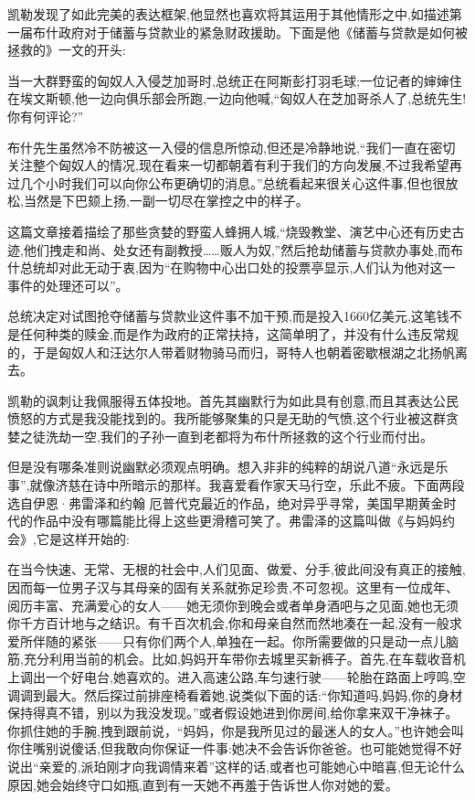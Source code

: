 凯勒发现了如此完美的表达框架,他显然也喜欢将其运用于其他情形之中,如描述第一届布什政府对于储蓄与贷款业的紧急财政援助。下面是他《储蓄与贷款是如何被拯救的》一文的开头:

当一大群野蛮的匈奴人入侵芝加哥时,总统正在阿斯彭打羽毛球;一位记者的婶婶住在埃文斯顿,他一边向俱乐部会所跑,一边向他喊,“匈奴人在芝加哥杀人了,总统先生!你有何评论?”

布什先生虽然冷不防被这一入侵的信息所惊动,但还是冷静地说,“我们一直在密切关注整个匈奴人的情况,现在看来一切都朝着有利于我们的方向发展,不过我希望再过几个小时我们可以向你公布更确切的消息。”总统看起来很关心这件事,但也很放松,当然是下巴颏上扬,一副一切尽在掌控之中的样子。

这篇文章接着描绘了那些贪婪的野蛮人蜂拥人城,“烧毁教堂、演艺中心还有历史古迹,他们拽走和尚、处女还有副教授……贩人为奴,”然后抢劫储蓄与贷款办事处,而布什总统却对此无动于衷,因为“在购物中心出口处的投票亭显示,人们认为他对这一事件的处理还可以”。

总统决定对试图抢夺储蓄与贷款业这件事不加干预,而是投入1660亿美元,这笔钱不是任何种类的赎金,而是作为政府的正常扶持，这简单明了，并没有什么违反常规的，于是匈奴人和汪达尔人带着财物骑马而归，哥特人也朝着密歇根湖之北扬帆离去。

凯勒的讽刺让我佩服得五体投地。首先其幽默行为如此具有创意,而且其表达公民愤怒的方式是我没能找到的。我所能够聚集的只是无助的气愤,这个行业被这群贪婪之徒洗劫一空,我们的子孙一直到老都将为布什所拯救的这个行业而付出。

但是没有哪条准则说幽默必须观点明确。想入非非的纯粹的胡说八道“永远是乐事”,就像济慈在诗中所暗示的那样。我喜爱看作家天马行空，乐此不疲。下面两段选自伊恩·弗雷泽和约翰	厄普代克最近的作品，绝对异乎寻常，美国早期黄金时代的作品中没有哪篇能比得上这些更滑稽可笑了。弗雷泽的这篇叫做《与妈妈约会》,它是这样开始的:

在当今快速、无常、无根的社会中,人们见面、做爱、分手,彼此间没有真正的接触,因而每一位男子汉与其母亲的固有关系就弥足珍贵,不可忽视。这里有一位成年、阅历丰富、充满爱心的女人——她无须你到晚会或者单身酒吧与之见面,她也无须你千方百计地与之结识。有千百次机会,你和母亲自然而然地凑在一起,没有一般求爱所伴随的紧张——只有你们两个人,单独在一起。你所需要做的只是动一点儿脑筋,充分利用当前的机会。比如,妈妈开车带你去城里买新裤子。首先,在车载收音机上调出一个好电台,她喜欢的。进入高速公路,车匀速行驶——轮胎在路面上哼鸣,空调调到最大。然后探过前排座椅看着她,说类似下面的话:“你知道吗,妈妈,你的身材保持得真不错，别以为我没发现。”或者假设她进到你房间,给你拿来双干净袜子。你抓住她的手腕,拽到跟前说，“妈妈，你是我所见过的最迷人的女人。”也许她会叫你住嘴别说傻话,但我敢向你保证一件事:她决不会告诉你爸爸。也可能她觉得不好说出“亲爱的,派珀刚才向我调情来着”这样的话,或者也可能她心中暗喜,但无论什么原因,她会始终守口如瓶,直到有一天她不再羞于告诉世人你对她的爱。

